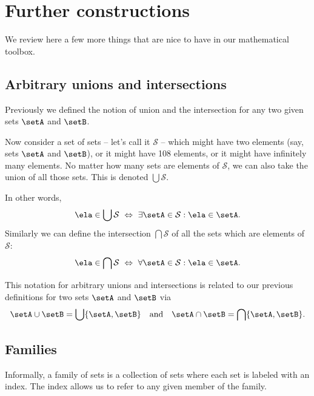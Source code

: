 
\section{Further constructions}
\label{sec:more-constructions}

We review here a few more things that are nice to have in our mathematical toolbox. 

\subsection{Arbitrary unions and intersections}

Previously we defined the notion of union and the intersection for any two given sets $\setA$ and $\setB$. 

Now consider a set of sets -- let's call it $\mathcal{S}$ -- which might have two elements (say, sets $\setA$ and $\setB$), or it might have 108 elements, or it might have infinitely many elements. No matter how many sets are elements of $\mathcal{S}$, we can also take the union of all those sets. This is denoted $\bigcup \mathcal{S}$. 

In other words, 
%
\begin{equation*}
    \ela \in \bigcup \mathcal{S}  \ \Leftrightarrow \ \exists \setA \in \mathcal{S} : \ela \in \setA.
\end{equation*}
%
Similarly we can define the intersection $\bigcap \mathcal{S}$ of all the sets which are elements of $\mathcal{S}$: 
%
\begin{equation*}
     \ela \in \bigcap \mathcal{S} \ \Leftrightarrow \  \forall \setA \in \mathcal{S} : \ela \in \setA.
\end{equation*}

This notation for arbitrary unions and intersections is related to our previous definitions for two sets $\setA$ and $\setB$ via
\begin{equation}
\setA \cup \setB = \bigcup \{ \setA, \setB \} \quad \text{and} \quad \setA \cap \setB = \bigcap \{ \setA, \setB \}.
\end{equation}



\subsection{Families}

Informally, a family of sets is a collection of sets where each set is labeled with an index. The index allows us to refer to any given member of the family. 

